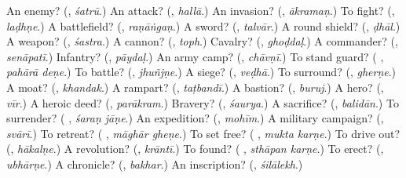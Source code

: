 \begin{tcolorbox}[breakable,colback=teal!4,colframe=teal!35!black,title={Before you move on}]
An enemy? (\textbf{}, \emph{śatrū}.) An attack? (\textbf{}, \emph{hallā}.) An invasion? (\textbf{}, \emph{ākramaṇ}.) To fight? (\textbf{}, \emph{laḍhṇe}.) A battlefield? (\textbf{}, \emph{raṇāṅgaṇ}.) A sword? (\textbf{}, \emph{talvār}.) A round shield? (\textbf{}, \emph{ḍhāl}.) A weapon? (\textbf{}, \emph{śastra}.) A cannon? (\textbf{}, \emph{toph}.) Cavalry? (\textbf{}, \emph{ghoḍdaḷ}.) A commander? (\textbf{}, \emph{senāpatī}.) Infantry? (\textbf{}, \emph{pāydaḷ}.) An army camp? (\textbf{}, \emph{chāvṇī}.) To stand guard? (\textbf{ }, \emph{pahārā deṇe}.) To battle? (\textbf{}, \emph{jhuñjṇe}.) A siege? (\textbf{}, \emph{veḍhā}.) To surround? (\textbf{}, \emph{gherṇe}.) A moat? (\textbf{}, \emph{khandak}.) A rampart? (\textbf{}, \emph{taṭbandī}.) A bastion? (\textbf{}, \emph{buruj}.) A hero? (\textbf{}, \emph{vīr}.) A heroic deed? (\textbf{}, \emph{parākram}.) Bravery? (\textbf{}, \emph{śaurya}.) A sacrifice? (\textbf{}, \emph{balidān}.) To surrender? (\textbf{ }, \emph{śaraṇ jāṇe}.) An expedition? (\textbf{}, \emph{mohīm}.) A military campaign? (\textbf{}, \emph{svārī}.) To retreat? (\textbf{ }, \emph{māghār gheṇe}.) To set free? (\textbf{ }, \emph{mukta karṇe}.) To drive out? (\textbf{}, \emph{hākalṇe}.) A revolution? (\textbf{}, \emph{krāntī}.) To found? (\textbf{ }, \emph{sthāpan karṇe}.) To erect? (\textbf{}, \emph{ubhārṇe}.) A chronicle? (\textbf{}, \emph{bakhar}.) An inscription? (\textbf{}, \emph{śilālekh}.)
\end{tcolorbox}
